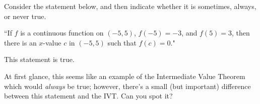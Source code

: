 \documentclass[handout]{ximera}
\begin{document}
\begin{exercise}

Consider the statement below, and then indicate whether it is sometimes, always, or never true.

\begin{center} ``If $f$ is a continuous function on $(-5, 5)$, $f(-5) = -3$, and $f(5) = 3$, then there is an $x$-value $c$ in $(-5,5)$ such that $f(c) = 0$." \end{center}

This statement is  true.

\begin{feedback}[correct]

At first glance, this seems like an example of the Intermediate Value Theorem which would \textit{always} be true; however, there's a small (but important) difference between this statement and the IVT.  Can you spot it?

\end{feedback}

\end{exercise}
\end{document}

